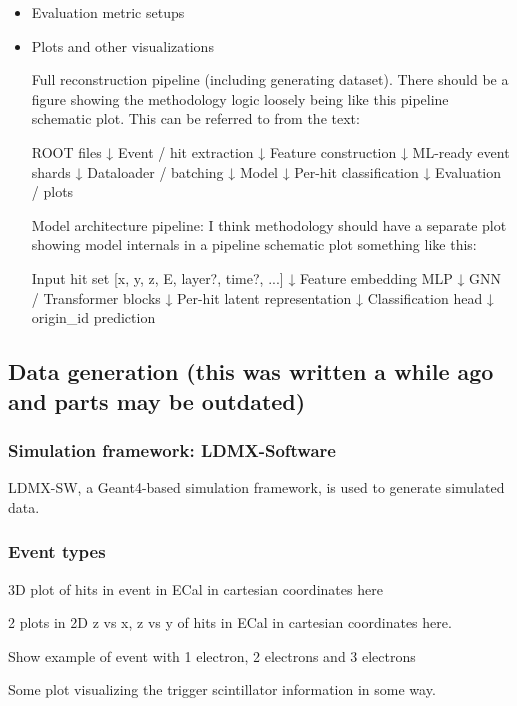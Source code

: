 \begin{itemize}
    \item Evaluation metric setups

    \item Plots and other visualizations

Full reconstruction pipeline (including generating dataset). There should be a figure showing the methodology logic loosely being like this pipeline schematic plot. This can be referred to from the text:

ROOT files
   ↓
Event / hit extraction
   ↓
Feature construction
   ↓
ML-ready event shards
   ↓
Dataloader / batching
   ↓
Model
   ↓
Per-hit classification
   ↓
Evaluation / plots

Model architecture pipeline: I think methodology should have a separate plot showing model internals in a pipeline schematic plot something like this:

Input hit set
[x, y, z, E, layer?, time?, ...]
        ↓
Feature embedding MLP
        ↓
GNN / Transformer blocks
        ↓
Per-hit latent representation
        ↓
Classification head
        ↓
origin_id prediction

\end{itemize}






\subsection{Data generation (this was written a while ago and parts may be outdated)}

\subsubsection{Simulation framework: LDMX-Software}

LDMX-SW, a Geant4-based simulation framework, is used to generate simulated data.   


\subsubsection{Event types}

3D plot of hits in event in ECal in cartesian coordinates here

2 plots in 2D z vs x, z vs y of hits in ECal in cartesian coordinates here.  

Show example of event with 1 electron, 2 electrons and 3 electrons

Some plot visualizing the trigger scintillator information in some way. 

